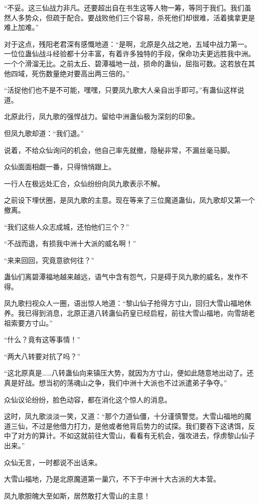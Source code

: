 \begin{this_body}
“不妥。这三仙战力非凡。还要超出自在书生这等人物一筹，等同于我们。我们虽然人多势众，但疏于配合。要战败他们三个容易，杀死他们却很难，活着擒拿更是难上加难。”

对于这点，残阳老君深有感慨地道：“是啊，北原是久战之地，五域中战力第一。一位位蛊仙战斗经验都十分丰富，有着许多独特的手段，保命功夫更远胜我中洲。一个个滑溜无比。之前太丘、碧潭福地一战，损命的蛊仙，屈指可数。这若放在其他四域，死伤数量绝对要高出两三倍的。”

“活捉他们也不是不可能，嘿嘿，只要凤九歌大人亲自出手即可。”有蛊仙这样说道。

北原此行，凤九歌的强悍战力。留给中洲蛊仙极为深刻的印象。

但凤九歌却道：“我们退。”

说着，不给众仙询问的机会，他自己率先就撤，隐秘非常，不漏丝毫马脚。

众仙面面相觑一番，只得悄悄跟上。

一行人在极远处汇合，众仙纷纷向凤九歌表示不解。

之前设下埋伏圈，是凤九歌的主意。现在等来了三位魔道蛊仙，凤九歌却又第一个撤离。

“我们这些人众志成城，还怕他们三个？”

“不战而退，有损我中洲十大派的威名啊！”

“来来回回，究竟意欲何往？”

蛊仙们离碧潭福地越来越远，语气中含有怨气，只是碍于凤九歌的威名，发作不得。

凤九歌扫视众人一圈，语出惊人地道：“黎山仙子抢得方寸山，回归大雪山福地休养。我已得到消息，北原正道八转蛊仙药皇已经启程，前往大雪山福地，向雪胡老祖索要方寸山。”

“什么？竟有这等事情！”

“两大八转要对抗了吗？”

“这北原真是……八转蛊仙向来镇压大势，就因为方寸山，便如此随意地出动了。还真是好战。想当初的荡魂山之争，我们中洲十大派也不过派遣弟子争夺。”

众仙议论纷纷，脸色动容，都在消化这个惊人的消息。

这时，凤九歌淡淡一笑，又道：“那个力道仙僵，十分谨慎警觉。大雪山福地的魔道三仙，不过是他借力打力，是他或者他背后势力的试探。我们要吞下这诱饵，反中了对方的算计。不如这就前往大雪山，看看有无机会，强攻进去，俘虏黎山仙子出来。”

众仙无言，一时都说不出话来。

大雪山福地，乃是北原魔道第一巢穴，不下于中洲十大古派的大本营。

凤九歌胆魄大至如斯，居然敢打大雪山的主意！


\end{this_body}

